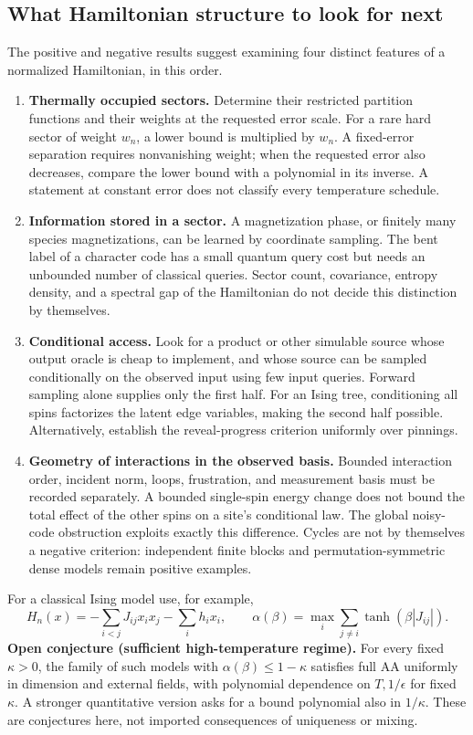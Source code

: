 \subsection{What Hamiltonian structure to look for next}
\label{tht:program}

The positive and negative results suggest examining four distinct
features of a normalized Hamiltonian, in this order.

\begin{enumerate}
\item \textbf{Thermally occupied sectors.} Determine their restricted
partition functions and their weights at the requested error scale.
For a rare hard sector of weight $w_n$, a lower bound is multiplied by
$w_n$. A fixed-error separation requires nonvanishing weight; when the
requested error also decreases, compare the lower bound with a
polynomial in its inverse. A statement at constant error does not
classify every temperature schedule.
\item \textbf{Information stored in a sector.} A magnetization phase,
or finitely many species magnetizations, can be learned by coordinate
sampling. The bent label of a character code has a small quantum query
cost but needs an unbounded number of classical queries. Sector count,
covariance, entropy density, and a spectral gap of the Hamiltonian do
not decide this distinction by themselves.
\item \textbf{Conditional access.} Look for a product or other
simulable source whose output oracle is cheap to implement, and whose
source can be sampled conditionally on the observed input using few
input queries. Forward sampling alone supplies only the first half.
For an Ising tree, conditioning all spins factorizes the latent edge
variables, making the second half possible. Alternatively, establish
the reveal-progress criterion uniformly over pinnings.
\item \textbf{Geometry of interactions in the observed basis.}
Bounded interaction order, incident norm, loops, frustration, and
measurement basis must be recorded separately. A bounded single-spin
energy change does not bound the total effect of the other spins on a
site's conditional law. The global noisy-code obstruction exploits
exactly this difference. Cycles are not by themselves a negative
criterion: independent finite blocks and permutation-symmetric dense
models remain positive examples.
\end{enumerate}

For a classical Ising model use, for example,
\[
 H_n(x)=-\sum_{i<j}J_{ij}x_ix_j-\sum_i h_i x_i,
 \qquad \alpha(\beta)=\max_i\sum_{j\ne i}
                  \tanh(\beta|J_{ij}|).
\]
\textbf{Open conjecture (sufficient high-temperature regime).}
For every fixed $\kappa>0$, the family of such models with
$\alpha(\beta)\le1-\kappa$ satisfies full AA uniformly in dimension
and external fields, with polynomial dependence on $T,1/\epsilon$
for fixed $\kappa$. A stronger quantitative version asks for a bound
polynomial also in $1/\kappa$. These are conjectures here, not imported
consequences of uniqueness or mixing.

